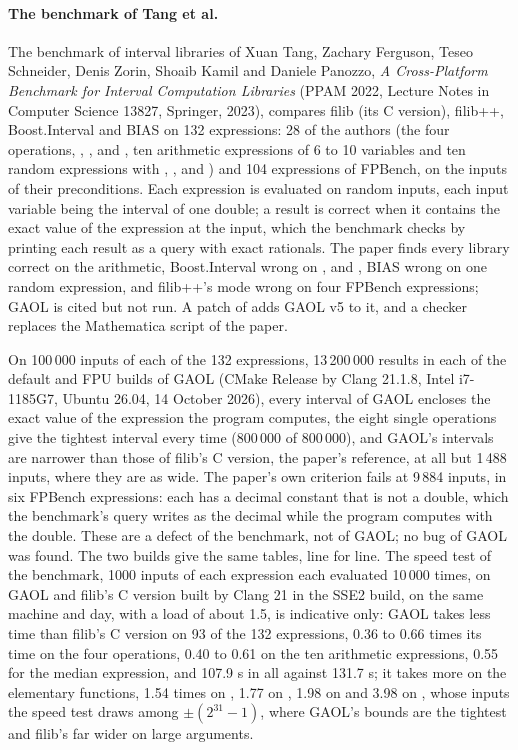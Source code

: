 \documentclass[12pt,a4paper,twoside,openright]{book}
\begin{document}
\paragraph{The benchmark of Tang et al.}
The benchmark of interval libraries of Xuan Tang, Zachary Ferguson, Teseo
Schneider, Denis Zorin, Shoaib Kamil and Daniele Panozzo, \emph{A
Cross-Platform Benchmark for Interval Computation Libraries} (PPAM 2022,
Lecture Notes in Computer Science 13827, Springer, 2023), compares filib
(its C version), filib++, Boost.Interval and BIAS on 132 expressions: 28 of
the authors (the four operations, , ,  and
, ten arithmetic expressions of 6 to 10 variables and ten random
expressions with , ,  and ) and 104
expressions of FPBench, on the inputs of their preconditions. Each
expression is evaluated on random inputs, each input variable being the
interval of one double; a result is correct when it contains the exact
value of the expression at the input, which the benchmark checks by printing
each result as a query with exact rationals. The paper finds every library
correct on the arithmetic, Boost.Interval wrong on , 
and , BIAS wrong on one random expression, and filib++'s
 mode wrong on four FPBench expressions; GAOL is
cited but not run. A patch of  adds GAOL v5 to
it, and a checker replaces the Mathematica script of the paper.

\medskip
On 100\,000 inputs of each of the 132 expressions, 13\,200\,000 results in
each of the default and FPU builds of GAOL (CMake Release by Clang 21.1.8,
Intel i7-1185G7, Ubuntu 26.04, 14 October 2026), every interval of GAOL
encloses the exact value of the expression the program computes, the eight
single operations give the tightest interval every time (800\,000 of
800\,000), and GAOL's intervals are narrower than those of filib's C
version, the paper's reference, at all but 1\,488 inputs, where they are as
wide.\newinvfive{} The paper's own criterion fails at 9\,884 inputs, in six
FPBench expressions: each has a decimal constant that is not a double, which
the benchmark's query writes as the decimal while the program computes with
the double. These are a defect of the benchmark, not of GAOL; no bug of GAOL
was found. The two builds give the same tables, line for line. The speed
test of the benchmark, 1000 inputs of each expression each evaluated 10\,000
times, on GAOL and filib's C version built by Clang 21 in the SSE2 build, on
the same machine and day, with a load of about 1.5, is indicative only: GAOL
takes less time than filib's C version on 93 of the 132 expressions, 0.36
to 0.66 times its time on the four operations, 0.40 to 0.61 on the ten
arithmetic expressions, 0.55 for the median expression, and 107.9 s in all
against 131.7 s; it takes more on the elementary functions, 1.54 times on
, 1.77 on , 1.98 on  and 3.98 on ,
whose inputs the speed test draws among $\pm(2^{31} - 1)$, where GAOL's
bounds are the tightest and filib's far wider on large arguments.
\end{document}
